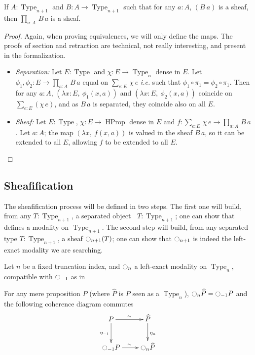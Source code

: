 \documentclass[notfinal]{jfrarticle}
\DeclareMathOperator{\Type}{Type}
\DeclareMathOperator{\HProp}{HProp}
\newcommand{\modal}{\ensuremath{\ocircle}}
\newcommand \separated {\mathop{\square_{n+1}} }
\newcommand{\sumD}[3]{\sum_{#1:#2}\, #3}
\newcommand{\prodD}[3]{\prod_{#1:#2}\, #3}
\newcommand{\code}[1]{\texttt{#1}}
\newcommand{\ie}{\emph{i.e.}}
\begin{document}
\begin{prop}[\thethm\ (\code{dep\_prod\_SnType\_j\_Type})]
\label{prop:sheaf-forall}
  If $A:\Type_{n+1}$ and $B:A \to \Type_{n+1}$ such that for any
  $a:A$, $(B~a)$ is a sheaf, then $\prodD a A {B\, a}$ is a sheaf.
\end{prop}
\begin{proof}
  Again, when proving equivalences, we will only define the maps. The
  proofs of section and retraction are technical, not really
  interesting, and present in the formalization.
  \begin{itemize}
  \item {\em Separation:} Let $E:\Type$ and $\chi:E \to \Type_n$ dense
    in $E$. Let $\phi_1,\phi_2:E\to \prodD a A {B\, a}$ equal on
    $\sumD e E{\chi\, e}$ \ie{} such that $\phi_1\circ \pi_1 = \phi_2\circ
    \pi_1$.
    Then for any $a:A$, $(\lambda x:E,~\phi_1(x, a))$
    and $(\lambda x:E,~\phi_2(x,a))$
    coincide on $\sum_{e:E}(\chi\, e)$, and as $B\, a$ is separated,
    they coincide also on all $E$.
  \item {\em Sheaf:} Let $E:\Type$, $\chi:E\to \HProp$ dense in $E$ and
    $f:\sumD e E {\chi\, e}\to \prodD a A{B\,a}$. Let $a:A$; the
    map $(\lambda x,~f(x,a))$ is valued in the sheaf $B\, a$, so it
    can be extended to all $E$, allowing $f$ to be extended to all
    $E$.
  \end{itemize}
\end{proof}

\subsection{Sheafification}
\label{ssec:sheafification}

The sheafification process will be defined in two steps. The first
one will build, from any $T:\Type_{n+1}$, a separated object $\separated
T:\Type_{n+1}$; one can show that $\separated$ defines a modality on
$\Type_{n+1}$. The second step will build, from any separated type
$T:\Type_{n+1}$, a sheaf $\modal_{n+1}(T)$; one can show that
$\modal_{n+1}$ is indeed the left-exact modality we are searching.

Let $n$ be a fixed truncation index, and $\modal_n$ a left-exact
modality on $\Type_n$, compatible with $\modal_{-1}$ as in
\begin{cond}\label{cond:hprop}
  For any mere proposition $P$ (where $\widehat P$ is $P$ seen as a
  $\Type_n$),  $\modal_n \widehat P = \modal_{-1} P$ and the
  following coherence diagram commutes
  \[\xymatrix{
    P \ar@{->}^{\sim}[r] \ar[d]_{\eta_{-1}} & \widehat P \ar[d]^{\eta_n} \\
    \modal_{-1} P \ar@{->}^{\sim}[r] & \modal_n \widehat P 
  }\]
\end{cond}
\end{document}
